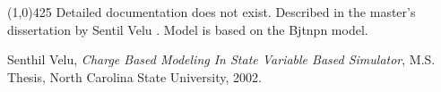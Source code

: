 \documentclass{article}
\begin{document}
\hrulefill\linethickness{0.5mm}\line(1,0){425} \normalsize
\newline
Detailed documentation does not exist. Described in the master's dissertation by Sentil Velu \cite{velu:ms}. Model is based on the Bjtnpn model.

\begin{thebibliography}{9}
Senthil Velu, \emph{Charge Based Modeling In State Variable Based Simulator}, M.S. Thesis, North Carolina State University, 2002.
\end{thebibliography}
\end{document}
